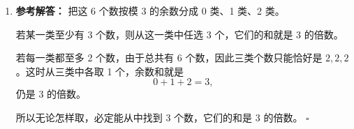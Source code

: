 \documentclass[11pt,a4paper,fontset=fandol]{ctexart}
\newenvironment{solution}{\par\noindent\textbf{参考解答：}}{\hfill$\square$\par}
\begin{document}
\begin{enumerate}
\begin{solution}
  另外，如果三类中都至少有 1 个数，那么从三类中各取 1 个，余数和为
  \[
  0+1+2=3,
  \]
  也是 3 的倍数，这也不允许。

  因此三类中至少有一类必须为空。于是所有被选数只能落在两类中，而且每类最多 2 个，所以最多只能选
  \[
  2+2=4
  \]
  个。

  这个上界可以达到，例如选
  \[
  \{1,4,2,5\}.
  \]
  任取 3 个时，余数和只可能是 $1$ 或 $2$（模 3），都不会是 0（模 3）。

  所以最多能选 4 个数。
  \end{solution}

  \item \begin{solution}
  把这 6 个数按模 3 的余数分成 0 类、1 类、2 类。

  若某一类至少有 3 个数，则从这一类中任选 3 个，它们的和就是 3 的倍数。

  若每一类都至多 2 个数，由于总共有 6 个数，因此三类个数只能恰好是 $2,2,2$。这时从三类中各取 1 个，余数和就是
  \[
  0+1+2=3,
  \]
  仍是 3 的倍数。

  所以无论怎样取，必定能从中找到 3 个数，它们的和是 3 的倍数。
  \end{solution}
\end{enumerate}
\end{document}
